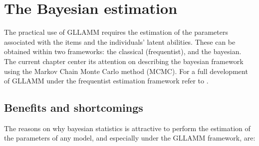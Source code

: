\chapter{The Bayesian estimation } \label{chap:estimation}

The practical use of GLLAMM requires the estimation of the parameters associated with the items and the individuals' latent abilities. These can be obtained within two frameworks: the classical (frequentist), and the bayesian. The current chapter center its attention on describing the bayesian framework using the Markov Chain Monte Carlo method (MCMC). For a full development of GLLAMM under the frequentist estimation framework refer to \citet{Rabe_et_al_2004a, Rabe_et_al_2004b, Skrondal_et_al_2004a, Rabe_et_al_2012}.


\section{Benefits and shortcomings}

The reasons on why bayesian statistics is attractive to perform the estimation of the parameters of any model, and especially under the GLLAMM framework, are:

